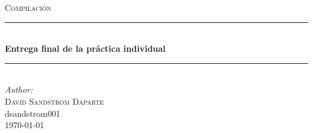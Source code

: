 \documentclass[12pt,a4paper,landscape]{article}
\theoremstyle{mytheor}
\begin{document}
\begin{titlepage}

  \newcommand{\HRule}{\rule{\linewidth}{0.5mm}} %
  
  \center %
   
  
  \textsc{\LARGE Compilación}\\[1.5cm] %
  
  
  \HRule \\[0.4cm]
  { \huge \bfseries Entrega final de la práctica individual}\\[0.4cm] %
  \HRule \\[1.5cm]
   
  
  
	\Large \emph{Author:}\\
 \textsc{David Sandström Daparte}\\
 dsandstrom001
  \\[2cm] %
  
  
  {\large \today}\\[1cm] %
  
 

\end{titlepage}
\end{document}
